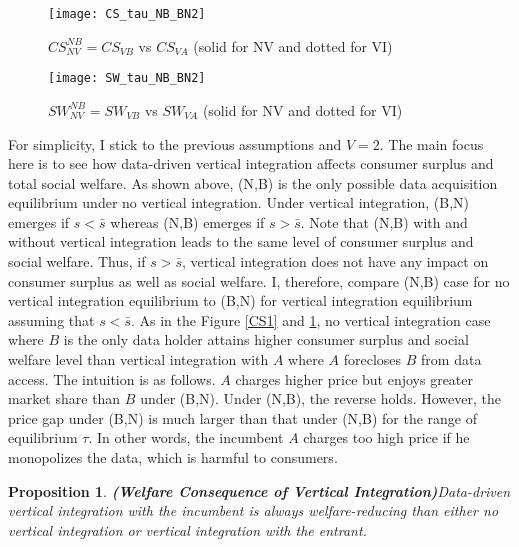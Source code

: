 \documentclass[12pt]{article}
\newtheorem{proposition}{Proposition}
\begin{document}
			\begin{figure}[!tbp]
	\centering
	\begin{minipage}[b]{0.45\textwidth}
		\texttt{[image: CS\_tau\_NB\_BN2]}
	\caption{$CS_{NV}^{NB}=CS_{VB}$ vs $CS_{VA}$ (solid for NV and dotted for VI) }\label{CS1}
	\end{minipage}
	\hfill
	\begin{minipage}[b]{0.45\textwidth}
		\texttt{[image: SW\_tau\_NB\_BN2]}
		\caption{$SW_{NV}^{NB}=SW_{VB}$ vs $SW_{VA}$ (solid for NV and dotted for VI)}\label{SW1}
\end{minipage}\end{figure}

For simplicity, I stick to the previous assumptions and $V=2$. The main focus here is to see how data-driven vertical integration affects consumer surplus and total social welfare. As shown above, (N,B) is the only possible data acquisition equilibrium under no vertical integration. Under vertical integration, (B,N) emerges if $s<\bar{s}$ whereas (N,B) emerges if $s>\bar{s}$. Note that (N,B) with and without vertical integration leads to the same level of consumer surplus and social welfare. Thus, if $s>\bar{s}$, vertical integration does not have any impact on consumer surplus as well as social welfare. I, therefore, compare (N,B) case for no vertical integration equilibrium to (B,N) for vertical integration equilibrium assuming that $s<\bar{s}$. As in the Figure \ref{CS1} and \ref{SW1}, no vertical integration case where $B$ is the only data holder attains higher consumer surplus and social welfare level than vertical integration with $A$ where $A$ forecloses $B$ from data access. The intuition is as follows. $A$ charges higher price but enjoys greater market share than $B$ under (B,N). Under (N,B), the reverse holds. However, the price gap under (B,N) is much larger than that under (N,B) for the range of equilibrium $\tau$. In other words, the incumbent $A$ charges too high price if he monopolizes the data, which is harmful to consumers.  

\begin{proposition}\textbf{(Welfare Consequence of Vertical Integration)}\label{welfare}
Data-driven vertical integration with the incumbent is always welfare-reducing than either no vertical integration or vertical integration with the entrant. 
\end{proposition}
\end{document}
